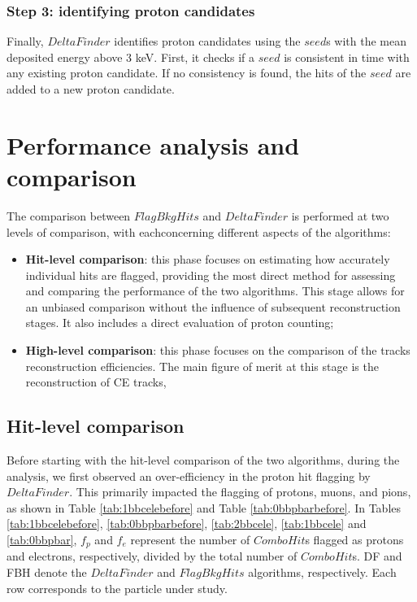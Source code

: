 \subsubsection{Step 3: identifying proton candidates}
Finally, $DeltaFinder$ identifies proton candidates 
using the $seed$s with the mean deposited energy above 3 keV. First, it checks 
if a $seed$ is consistent in time with any existing 
proton candidate. If no consistency is found, 
the hits of the $seed$ are added to a new proton candidate.


\section{Performance analysis and comparison}
The comparison between $FlagBkgHits$ and $DeltaFinder$ 
is performed at two levels of 
comparison, with eachconcerning different aspects 
  of the algorithms: 
\begin{itemize}
    \item \textbf{Hit-level comparison}: this 
    phase focuses 
    on estimating how accurately individual hits are 
    flagged, providing the most direct method for 
    assessing and comparing the performance of the two 
    algorithms. This stage allows for an unbiased 
    comparison without the influence of subsequent 
    reconstruction stages. It also includes a 
    direct evaluation of proton counting;
    
    \item \textbf{High-level comparison}: this phase focuses on the 
    comparison of the tracks reconstruction efficiencies. The main figure 
    of merit at this stage is the 
    reconstruction of CE tracks, 

\end{itemize}

\subsection{Hit-level comparison}
Before starting with the hit-level 
comparison of the two algorithms, during the analysis, 
we first observed an over-efficiency 
in the proton hit flagging by $DeltaFinder$. 
This primarily impacted the flagging of 
protons, muons, and pions, as shown in 
Table \ref{tab:1bbcelebefore} and Table 
\ref{tab:0bbpbarbefore}. In Tables 
\ref{tab:1bbcelebefore}, \ref{tab:0bbpbarbefore}, 
\ref{tab:2bbcele}, \ref{tab:1bbcele} and 
\ref{tab:0bbpbar}, $f_p$ and 
$f_e$ represent 
the number of $ComboHit$s flagged as 
protons and electrons, respectively, 
divided by the total number of 
$ComboHit$s. DF and FBH denote the $DeltaFinder$ 
and $FlagBkgHits$ algorithms, 
respectively. Each row corresponds to the particle 
under study.

